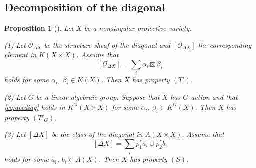 \documentclass[12pt]{amsart}
\newcommand{\rom}{\textup}
\newtheorem{Proposition}[equation]{Proposition}
\theoremstyle{definition}
\theoremstyle{remark}
\numberwithin{equation}{subsection}
\newcommand{\shfO}{\mathcal O}
\begin{document}
\subsection{Decomposition of the diagonal}

\begin{Proposition}[]
\label{prop:decdiag}
Let $X$ be a nonsingular projective variety.

\rom{(1)} Let $\shfO_{\Delta X}$ be the structure sheaf of the
diagonal and $[\shfO_{\Delta X}]$ the corresponding element in
$K(X\times X)$. Assume that
\begin{equation}\label{eq:decdiag}
  [\shfO_{\Delta X}] = \sum_i \alpha_i\boxtimes \beta_i
\end{equation}
holds for some $\alpha_i$, $\beta_i\in K(X)$. Then $X$ has property
$(T')$.

\rom{(2)} Let $G$ be a linear algebraic group.
Suppose that $X$ has $G$-action and that \eqref{eq:decdiag} holds in
$K^G(X\times X)$ for some $\alpha_i$, $\beta_i\in K^G(X)$. Then $X$
has property $(T'_G)$.

\rom{(3)} Let $[\Delta X]$ be the class of the diagonal in
$A(X\times X)$. Assume that
\begin{equation}\label{eq:decdiagHom}
  [\Delta X] = \sum_i p_1^* a_i\cup p_2^*b_i
\end{equation}
holds for some $a_i$, $b_i\in A(X)$. Then $X$ has property
$(S)$.
\end{Proposition}
\end{document}
